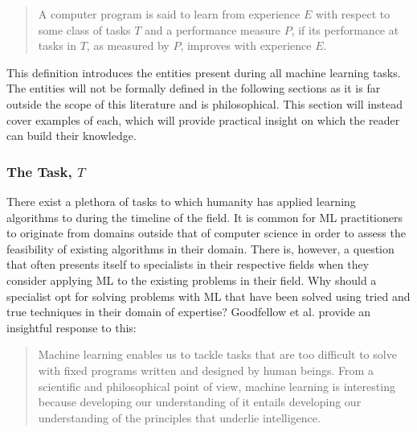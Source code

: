 \begin{quote}
    A computer program is said to learn from experience $E$ with respect to some class of tasks $T$ and a performance measure $P$, if its performance at tasks in $T$, as measured by $P$, improves with experience $E$.
\end{quote}

This definition introduces the entities present during all machine learning tasks. The entities will not be formally defined in the following sections as it is far outside the scope of this literature and is philosophical. This section will instead cover examples of each, which will provide practical insight on which the reader can build their knowledge.

\subsubsection{The Task, $T$}
There exist a plethora of tasks to which humanity has applied learning algorithms to during the timeline of the field. It is common for \gls{ML} practitioners to originate from domains outside that of computer science in order to assess the feasibility of existing algorithms in their domain. There is, however, a question that often presents itself to specialists in their respective fields when they consider applying \gls{ML} to the existing problems in their field. Why should a specialist opt for solving problems with \gls{ML} that have been solved using tried and true techniques in their domain of expertise? Goodfellow et al. \cite{Goodfellow-et-al-2016} provide an insightful response to this:

\begin{quote}
    Machine learning enables us to tackle tasks that are too difficult to solve with fixed programs written and designed by human beings. From a scientific and philosophical point of view, machine learning is interesting because developing our understanding of it entails developing our understanding of the principles that underlie intelligence.
\end{quote}

